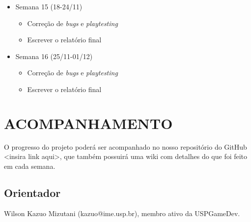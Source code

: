 \documentclass[a4paper, 11pt]{article}
\begin{document}
\begin{itemize}
\item Semana 15 (18-24/11)
 \begin{itemize} 
 \item Correção de \textit{bugs} e \textit{playtesting}
 \item Escrever o relatório final
 \end{itemize}

\item Semana 16 (25/11-01/12)
 \begin{itemize} 
 \item Correção de \textit{bugs} e \textit{playtesting}
 \item Escrever o relatório final
 \end{itemize}

\end{itemize}

\section{ACOMPANHAMENTO}
 	O progresso do projeto poderá ser acompanhado no nosso repositório do GitHub <insira link aqui>, 
 que também possuirá uma wiki com detalhes do que foi feito em cada semana.

 \subsection{Orientador} Wilson Kazuo Mizutani (kazuo@ime.usp.br), membro ativo da USPGameDev.
\end{document}
